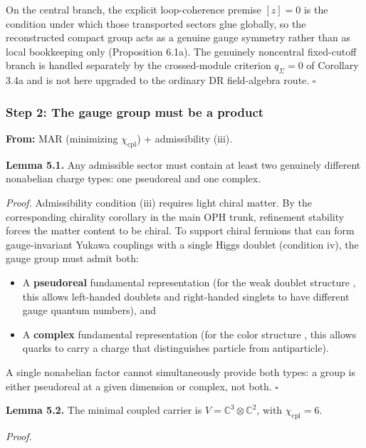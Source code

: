 On the central branch, the explicit loop-coherence premise \([z]=0\) is the condition under which those transported sectors glue globally, so the reconstructed compact group acts as a genuine gauge symmetry rather than as local bookkeeping only (Proposition 6.1a). The genuinely noncentral fixed-cutoff branch is handled separately by the crossed-module criterion \(q_\Sigma=0\) of Corollary 3.4a and is not here upgraded to the ordinary DR field-algebra route. \(\square\)

\subsubsection{Step 2: The gauge group must be a product}\label{step-2-the-gauge-group-must-be-a-product}

\textbf{From:} MAR (minimizing \(\chi_{\mathrm{cpl}}\)) + admissibility (iii).

\textbf{Lemma 5.1.} Any admissible sector must contain at least two genuinely different nonabelian charge types: one pseudoreal and one complex.

\emph{Proof.} Admissibility condition (iii) requires light chiral matter. By the corresponding chirality corollary in the main OPH trunk, refinement stability forces the matter content to be chiral. To support chiral fermions that can form gauge-invariant Yukawa couplings with a single Higgs doublet (condition iv), the gauge group must admit both:

\begin{itemize}
\tightlist
\item
  A \textbf{pseudoreal} fundamental representation (for the weak doublet structure , this allows left-handed doublets and right-handed singlets to have different gauge quantum numbers), and
\item
  A \textbf{complex} fundamental representation (for the color structure , this allows quarks to carry a charge that distinguishes particle from antiparticle).
\end{itemize}

A single nonabelian factor cannot simultaneously provide both types: a group is either pseudoreal at a given dimension or complex, not both. \(\square\)

\textbf{Lemma 5.2.} The minimal coupled carrier is \(V = \mathbb{C}^3 \otimes \mathbb{C}^2\), with \(\chi_{\mathrm{cpl}} = 6\).

\emph{Proof.}

